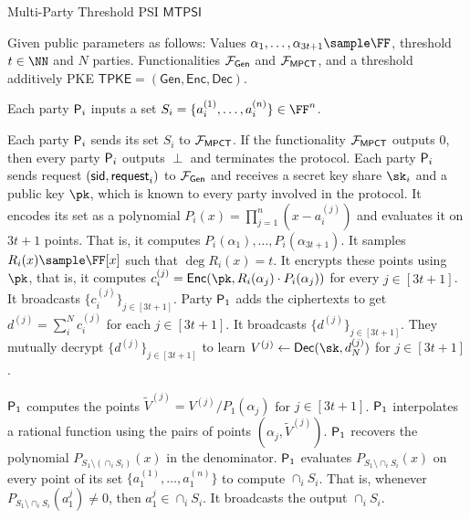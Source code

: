 \begin{algorithm}
\caption{Multi-Party Threshold  PSI $\mathsf{MTPSI}$}
\label{pro:MTPSI}
\begin{algorithmic}[1]
\REQUIRE Given public parameters as follows: Values $\alpha_{1}, \dots, \alpha_{3t+1}\sample\FF$, threshold $t\in\NN$ and $N$ parties. Functionalities $\mathcal{F}_{\mathsf{Gen}}$ and $\mathcal{F}_{\mathsf{MPCT}}$, and a threshold additively PKE $\mathsf{TPKE}=(\mathsf{Gen},\mathsf{Enc},\mathsf{Dec})$.

\ENSURE Each party $\mathsf{P}_i$ inputs a set $S_{i}=\{a_i^{(1)},\dots,a_i^{(n)}\} \in \FF^n$.

\STATE Each party $\mathsf{P}_i$ sends its set $S_{i}$ to $\mathcal{F}_{\mathsf{MPCT}}$. If the functionality $\mathcal{F}_{\mathsf{MPCT}}$ outputs $0$, then every party $\mathsf{P}_i$ outputs $\perp$ and terminates the protocol.
\STATE Each party $\mathsf{P}_i$  sends  request $(\mathsf{sid},\mathsf{request}_i)$ to $\mathcal{F}_{\mathsf{Gen}}$ and receives a secret key share $\sk_i$ and a public key $\pk$, which is known to every party involved in the protocol. 
    \STATE It encodes its set as a polynomial $P_i(x)=\prod_{j=1}^n (x-a_i^{(j)})$ and evaluates it on $3t+1$ points. That is, it computes $P_i(\alpha_{1}), \dots, P_i(\alpha_{3t+1})$.
    \STATE It samples $R_i(x)\sample \FF[x]$ such that $\deg R_i(x)=t$.
    \STATE It encrypts these points using $\pk$, that is, it computes $c_i^{(j)}=\mathsf{Enc}(\pk,R_i(\alpha_j)\cdot P_i(\alpha_{j}))$ for every $j\in [3t+1]$.
    \STATE It broadcasts $\{c_i^{(j)}\}_{j\in [3t+1]}$.
\ENDFOR
\STATE Party $\mathsf{P}_1$ adds the ciphertexts to get $d^{(j)}=\sum_{i}^{N} c_i^{(j)}$ for each $j\in [3t+1]$. It broadcasts $\{d^{(j)}\}_{j\in [3t+1]}$.
\STATE They mutually decrypt $\{d^{(j)}\}_{j\in [3t+1]}$ to learn $V^{(j)}\leftarrow \mathsf{Dec}(\sk,d_{N}^{(j)})$ for $j\in [3t+1]$.

\STATE $\mathsf{P}_1$ computes the points $\tilde{V}^ {(j)}=V^{(j)}/P_1(\alpha_j)$ for $j\in [3t+1]$.
\STATE $\mathsf{P}_1$ interpolates a rational function using the pairs of points $(\alpha_j,\tilde{V}^ {(j)})$. 
\STATE $\mathsf{P}_1$ recovers the polynomial $P_{S_1\setminus (\cap_{i} S_i)}(x)$ in the denominator.
\STATE $\mathsf{P}_1$ evaluates $P_{S_1\setminus \cap_{i} S_i}(x)$ on every point of its set  $\{a_1^{(1)},\dots,a_1^{(n)}\}$ to compute $\cap_i S_i$. That is, whenever $P_{S_1\setminus \cap_{i} S_i}(a_1^{j})\neq 0$, then $a_1^{j}\in \cap_i S_i$.
\STATE It broadcasts the output $\cap_i S_i$.
\end{algorithmic}
\end{algorithm}

